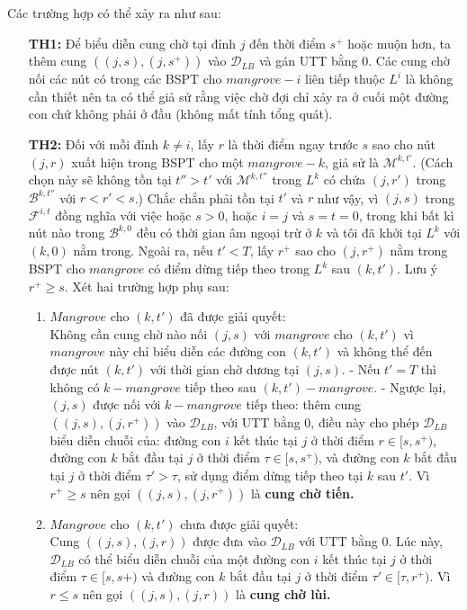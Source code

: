\documentclass[../main.tex]{subfiles}
\begin{document}
Các trường hợp có thể xảy ra như sau:

\begin{enumerate}
\def\labelenumi{\arabic{enumi}.}
\item[\textbf{TH1:}]
Để biểu diễn cung chờ tại đỉnh \(j\) đến thời
  điểm \(s^+\) hoặc muộn hơn, ta thêm cung \(((j, s), (j, s^+))\) vào
  \(\mathcal D_{LB}\) và gán UTT bằng \(0\). Các cung chờ nối các nút có
  trong các BSPT cho \(mangrove-i\) liên tiếp thuộc \(L^i\) là không cần
  thiết nên ta có thể giả sử rằng việc chờ đợi chỉ xảy ra ở cuối một
  đường con chứ không phải ở đầu (không mất tính tổng quát).
\item[\textbf{TH2:}]
   Đối với mỗi đỉnh \(k\neq i\), lấy \(r\) là thời
  điểm ngay trước \(s\) sao cho nút \((j,r)\) xuất hiện trong BSPT cho
  một \(mangrove-k\), giả sử là \(\mathcal M^{k,t'}\). (Cách chọn này sẽ
  không tồn tại \(t'' > t'\) với \(\mathcal M^{k,t''}\) trong \(L^k\) có
  chứa \((j,r')\) trong \(\mathcal B^{k,t''}\) với \(r < r' < s\).) Chắc
  chắn phải tồn tại \(t'\) và \(r\) như vậy, vì \((j, s)\) trong
  \(\mathcal F^{i,t}\) đồng nghĩa với việc hoặc \(s>0\), hoặc \(i = j\) và
  \(s = t = 0\), trong khi bất kì nút nào trong \(\mathcal B^{k,0}\) đều có
  thời gian âm ngoại trừ ở \(k\) và tôi đã khởi tại \(L^k\) với
  \((k,0)\) nằm trong. Ngoài ra, nếu \(t'<T\), lấy \(r^+\) sao cho
  \((j,r^+)\) nằm trong BSPT cho \(mangrove\) có điểm dừng tiếp theo
  trong \(L^k\) sau \((k, t')\). Lưu ý \(r^+ \geq s\). Xét hai trường
  hợp phụ sau:

  \begin{enumerate}
  \def\labelenumii{\alph{enumii}.}
  \tightlist
  \item
    \(Mangrove\) cho \((k, t')\) đã được giải quyết: \\
    Không cần cung chờ
    nào nối \((j,s)\) với \(mangrove\) cho \((k,t')\) vì \(mangrove\)
    này chỉ biểu diễn các đường con \((k,t')\) và không thể đến được nút
    \((k, t')\) với thời gian chờ dương tại \((j, s)\). - Nếu \(t'=T\)
    thì không có \(k-mangrove\) tiếp theo sau \((k,t')-mangrove\). -
    Ngược lại, \((j,s)\) được nối với \(k-mangrove\) tiếp theo: thêm
    cung \(((j,s),(j,r^+))\) vào \(\mathcal D_{LB}\), với UTT bằng
    \(0\), điều này cho phép \(\mathcal D_{LB}\) biểu diễn chuỗi của:
    đường con \(i\) kết thúc tại \(j\) ở thời điểm \(r\in [s,s^+)\),
    đường con \(k\) bắt đầu tại \(j\) ở thời điểm \(\tau \in [s, s^+)\),
    và đường con \(k\) bắt đầu tại \(j\) ở thời điểm \(\tau' > \tau\),
    sử dụng điểm dừng tiếp theo tại \(k\) sau \(t'\). Vì \(r^+ \geq s\)
    nên gọi \(((j,s),(j,r^+))\) là \textbf{cung chờ tiến.}
  \item
    \(Mangrove\) cho \((k, t')\) chưa được giải quyết: \\
    Cung
    \(((j,s),(j,r))\) được đưa vào \(\mathcal D_{LB}\) với UTT bằng 0.
    Lúc này, \(\mathcal D_{LB}\) có thể biểu diễn chuỗi của một đường
    con \(i\) kết thúc tại \(j\) ở thời điểm \(\tau \in [s,s+)\) và
    đường con \(k\) bắt đầu tại \(j\) ở thời điểm
    \(\tau' \in [\tau,r^+)\). Vì \(r\leq s\) nên gọi \(((j,s),(j,r))\)
    là \textbf{cung chờ lùi.}
  \end{enumerate}
\end{enumerate}
\end{document}
